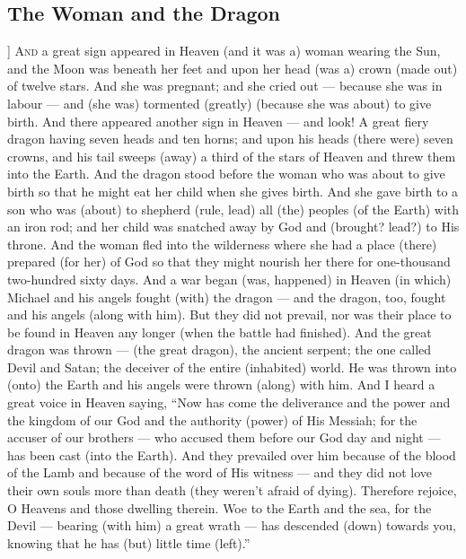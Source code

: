 \begin{pages}
\begin{Leftside}
        			\chapter{The Woman and the Dragon}
				]		
		\renewcommand{\LettrineFontHook}{\Zallmanfamily}
		\lettrine[lines=3]{A}{nd} a great sign appeared in Heaven (and it was a) woman wearing the Sun, and the Moon was beneath her feet and upon her head (was a) crown (made out) of twelve stars. And she was pregnant; and she cried out — because she was in labour — and (she was) tormented (greatly) (because she was about) to give birth. 
		\pend
		\pstart
		And there appeared another sign in Heaven — and look! A great fiery dragon having seven heads and ten horns; and upon his heads (there were) seven crowns, and his tail sweeps (away) a third of the stars of Heaven and threw them into the Earth. And the dragon stood before the woman who was about to give birth so that he might eat her child when she gives birth. And she gave birth to a son who was (about) to shepherd (rule, lead) all (the) peoples (of the Earth) with an iron rod; and her child was snatched away by God and (brought? lead?) to His throne. 
		\pend
		\pstart
		And the woman fled into the wilderness where she had a place (there) prepared (for her) of God so that they might nourish her there for one-thousand two-hundred sixty days. And a war began (was, happened) in Heaven (in which) Michael and his angels fought (with) the dragon — and the dragon, too, fought and his angels (along with him). But they did not prevail, nor was their place to be found in Heaven any longer (when the battle had finished). 
		\pend
		\pstart
		And the great dragon was thrown — (the great dragon), the ancient serpent; the one called Devil and Satan; the deceiver of the entire (inhabited) world. He was thrown into (onto) the Earth and his angels were thrown (along) with him. And I heard a great voice in Heaven saying, “Now has come the deliverance and the power and the kingdom of our God and the authority (power) of His Messiah; for the accuser of our brothers — who accused them before our God day and night — has been cast (into the Earth). 
		\pend
		\pstart
		And they prevailed over him because of the blood of the Lamb and because of the word of His witness — and they did not love their own souls more than death (they weren’t afraid of dying). Therefore rejoice, O Heavens and those dwelling therein. Woe to the Earth and the sea, for the Devil — bearing (with him) a great wrath — has descended (down) towards you, knowing that he has (but) little time (left).”

\end{Leftside}
\end{pages}
